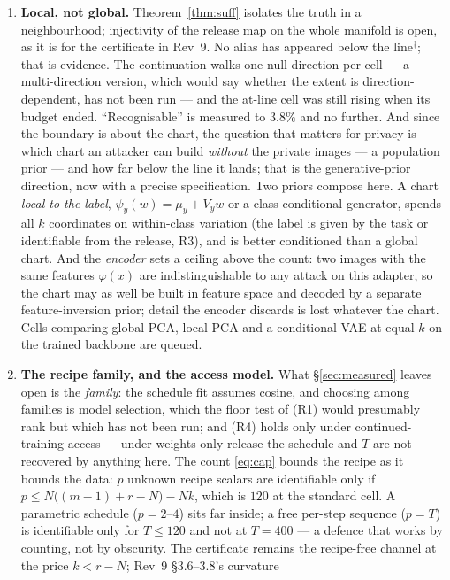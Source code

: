 \begin{enumerate}\itemsep3pt
\item \textbf{Local, not global.} Theorem~\ref{thm:suff} isolates the truth
  in a neighbourhood; injectivity of the release map on the whole manifold
  is open, as it is for the certificate in Rev~9. No alias has appeared below
  the line$^\dagger$; that is evidence. The continuation walks one null
  direction per cell — a multi-direction version, which would say whether the
  extent is direction-dependent, has not been run — and the at-line cell was
  still rising when its budget ended. ``Recognisable'' is measured to $3.8\%$
  and no further. And since the boundary is about the chart, the question
  that matters for privacy is which chart an attacker can build
  \emph{without} the private images — a population prior — and how far below
  the line it lands; that is the generative-prior direction, now with a
  precise specification. Two priors compose here. A chart \emph{local to the
  label}, $\psi_y(w)=\mu_y+V_yw$ or a class-conditional generator, spends
  all $k$ coordinates on within-class variation (the label is given by the
  task or identifiable from the release, R3), and is better conditioned than
  a global chart. And the \emph{encoder} sets a ceiling above the count: two
  images with the same features $\varphi(x)$ are indistinguishable to any
  attack on this adapter, so the chart may as well be built in feature space
  and decoded by a separate feature-inversion prior; detail the encoder
  discards is lost whatever the chart. Cells comparing global PCA, local PCA
  and a conditional VAE at equal $k$ on the trained backbone are queued.
\item \textbf{The recipe family, and the access model.} What
  \S\ref{sec:measured} leaves open is the \emph{family}: the schedule fit
  assumes cosine, and choosing among families is model selection, which the
  floor test of (R1) would presumably rank but which has not been run; and
  (R4) holds only under continued-training access — under weights-only
  release the schedule and $T$ are not recovered by anything here. The count \eqref{eq:cap} bounds the recipe
  as it bounds the data: $p$ unknown recipe scalars are identifiable only if
  $p\le N\bigl((m-1)+r-N\bigr)-Nk$, which is $120$ at the standard cell. A
  parametric schedule ($p=2$--$4$) sits far inside; a free per-step sequence
  ($p=T$) is identifiable only for $T\le120$ and not at $T=400$ — a defence
  that works by counting, not by obscurity. The certificate remains the
  recipe-free channel at the price $k<r-N$; Rev~9 \S3.6--3.8's curvature

\end{enumerate}
